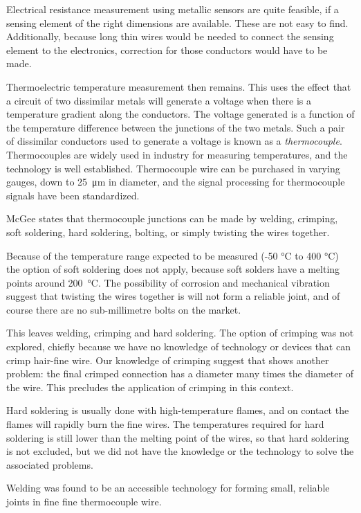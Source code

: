 Electrical resistance measurement using metallic sensors are quite feasible, if
a sensing element of the right dimensions are available. These are not easy to
find. Additionally, because long thin wires would be needed to connect the
sensing element to the electronics, correction for those conductors would have to be made. 

Thermoelectric temperature measurement then remains. This uses the effect that a
circuit of two dissimilar metals will generate a voltage when there is a
temperature gradient along the conductors. The voltage generated is a function
of the temperature difference between the junctions of the two metals. Such a
pair of dissimilar conductors used to generate a voltage is known as a
\textit{thermocouple}. Thermocouples are widely used in industry for measuring
temperatures, and the technology is well established. Thermocouple wire can be
purchased in varying gauges, down to \SI{25}{\micro\metre} in diameter, and the signal
processing for thermocouple signals have been standardized.

McGee \autocite{Mcgee1988} states that thermocouple junctions can be made by
welding, crimping, soft soldering, hard soldering, bolting, or simply twisting
the wires together.

Because of the temperature range expected to be measured ({-}50 \si{\celsius} to
400 \si{\celsius}) the option of soft soldering does not apply, because soft
solders have a melting points around \SI{200}{\celsius}. The
possibility of corrosion and mechanical vibration suggest that twisting the wires together is
will not form a reliable joint, and of course there are no sub-millimetre bolts on the market.

This leaves welding, crimping and hard soldering. The option of crimping was not
explored, chiefly because we have no knowledge of technology or devices that can
crimp hair-fine wire. Our knowledge of crimping suggest that shows another
problem: the final crimped connection has a diameter many times the diameter of
the wire. This precludes the application of crimping in this context.

Hard soldering is usually done with high-temperature flames, and on contact the
flames will rapidly burn the fine wires. The temperatures required for hard
soldering is still lower than the melting point of the wires, so that hard
soldering is not excluded, but we did not have the knowledge or the technology
to solve the associated problems.

Welding was found to be an accessible technology for forming small, reliable
joints in fine fine thermocouple wire.

